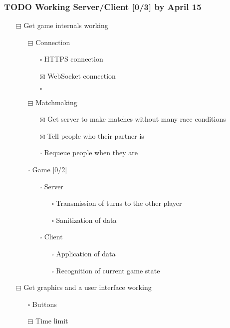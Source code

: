\documentclass[11pt]{article}
\begin{document}
\subsubsection{{\bfseries\sffamily TODO} Working Server/Client [0/3] by April 15}
\label{sec:org8a5191d}
\begin{itemize}
\item[{$\boxminus$}] Get game internals working
\begin{itemize}
\item[{$\boxminus$}] Connection
\begin{itemize}
\item[{$\square$}] HTTPS connection
\item[{$\boxtimes$}] WebSocket connection
\item[{$\square$}] 
\end{itemize}
\item[{$\boxminus$}] Matchmaking
\begin{itemize}
\item[{$\boxtimes$}] Get server to make matches without many race conditions
\item[{$\boxtimes$}] Tell people who their partner is
\item[{$\square$}] Requeue people when they are
\end{itemize}
\item[{$\square$}] Game [0/2]
\begin{itemize}
\item[{$\square$}] Server
\begin{itemize}
\item[{$\square$}] Transmission of turns to the other player
\item[{$\square$}] Sanitization of data
\end{itemize}
\item[{$\square$}] Client
\begin{itemize}
\item[{$\square$}] Application of data
\item[{$\square$}] Recognition of current game state
\end{itemize}
\end{itemize}
\end{itemize}
\item[{$\boxminus$}] Get graphics and a user interface working
\begin{itemize}
\item[{$\square$}] Buttons
\item[{$\boxminus$}] Time limit
\begin{itemize}

\end{itemize}
\end{itemize}
\end{itemize}
\end{document}
